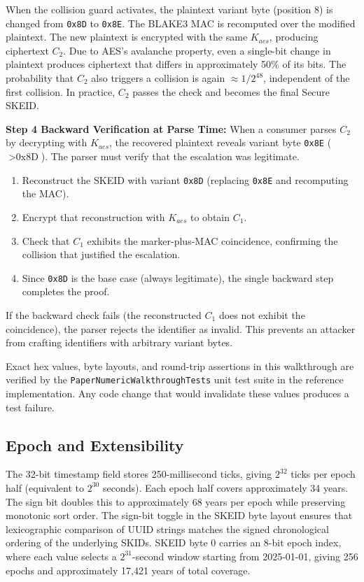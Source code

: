 \documentclass[fleqn,10pt,lineno]{wlpeerj}
\providecommand{\tightlist}{%
  \setlength{\itemsep}{0pt}\setlength{\parskip}{0pt}}
\begin{document}
When the collision guard activates, the plaintext variant byte (position
8) is changed from \texttt{0x8D} to \texttt{0x8E}. The BLAKE3 MAC is
recomputed over the modified plaintext. The new plaintext is encrypted
with the same \(K_{aes}\), producing ciphertext \(C_2\). Due to AES's
avalanche property, even a single-bit change in plaintext produces
ciphertext that differs in approximately 50\% of its bits. The
probability that \(C_2\) also triggers a collision is again
\(\approx 1/2^{48}\), independent of the first collision. In practice,
\(C_2\) passes the check and becomes the final Secure SKEID.

\textbf{Step 4 Backward Verification at Parse Time:} When a consumer
parses \(C_2\) by decrypting with \(K_{aes}\), the recovered plaintext
reveals variant byte \texttt{0x8E} (\(> \text{0x8D}\)). The parser must
verify that the escalation was legitimate.

\begin{enumerate}
\def\labelenumi{\arabic{enumi}.}
\tightlist
\item
  Reconstruct the SKEID with variant \texttt{0x8D} (replacing
  \texttt{0x8E} and recomputing the MAC).
\item
  Encrypt that reconstruction with \(K_{aes}\) to obtain \(C_1\).
\item
  Check that \(C_1\) exhibits the marker-plus-MAC coincidence,
  confirming the collision that justified the escalation.
\item
  Since \texttt{0x8D} is the base case (always legitimate), the single
  backward step completes the proof.
\end{enumerate}

If the backward check fails (the reconstructed \(C_1\) does not exhibit
the coincidence), the parser rejects the identifier as invalid. This
prevents an attacker from crafting identifiers with arbitrary variant
bytes.

Exact hex values, byte layouts, and round-trip assertions in this
walkthrough are verified by the \texttt{PaperNumericWalkthroughTests}
unit test suite in the reference implementation. Any code change that
would invalidate these values produces a test failure.

\subsection{Epoch and Extensibility}\label{epoch-and-extensibility}

The 32-bit timestamp field stores 250-millisecond ticks, giving
\(2^{32}\) ticks per epoch half (equivalent to \(2^{30}\) seconds). Each
epoch half covers approximately 34 years. The sign bit doubles this to
approximately 68 years per epoch while preserving monotonic sort order.
The sign-bit toggle in the SKEID byte layout ensures that lexicographic
comparison of UUID strings matches the signed chronological ordering of
the underlying SKIDs. SKEID byte 0 carries an 8-bit epoch index, where
each value selects a \(2^{31}\)-second window starting from 2025-01-01,
giving 256 epochs and approximately 17,421 years of total coverage.
\end{document}
